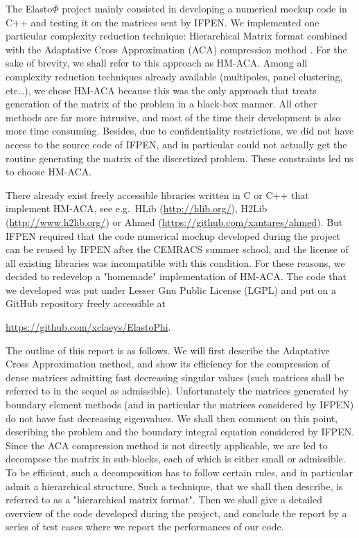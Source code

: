 \bigskip
The Elasto$\Phi$ project mainly consisted in developing a numerical mockup code in C++ and testing it on the matrices sent 
by IFPEN. We implemented one particular complexity reduction technique: Hierarchical Matrix \cite{Hackbusch2016} format combined with the Adaptative Cross 
Approximation (ACA) compression method \cite{Bebendorf2008}. For the sake of brevity, we shall refer to this approach as HM-ACA. 
Among all complexity reduction techniques 
already available (multipoles, panel clustering, etc\dots), we chose HM-ACA because this was the only approach that treats generation 
of the matrix of the problem in a black-box manner. All other methods are far more intrusive, and most of the time their development 
is also more time consuming. Besides, due to confidentiality restrictions, we did not have access to the source code of IFPEN, and 
in particular could not actually get the routine generating the matrix of the discretized problem. These constraints led us to choose HM-ACA.

\bigskip
There already exist freely accessible libraries written in C or C++ that implement HM-ACA, see e.g.~HLib (\url{http://hlib.org/}), H2Lib 
(\url{http://www.h2lib.org/}) or Ahmed (\url{https://github.com/xantares/ahmed}). But IFPEN required 
that the code numerical mockup developed during the project can be reused by IFPEN after the CEMRACS summer school, 
and the license of all existing libraries was incompatible with this condition. For these reasons, we decided to redevelop 
a "homemade" implementation of HM-ACA. The code that we developed was put under Lesser Gnu Public License (LGPL) and 
put on a GitHub repository freely accessible at
\begin{center}
\url{https://github.com/xclaeys/ElastoPhi}.
\end{center}

\medskip
The outline of this report is as follows. We will first describe the Adaptative Cross Approximation method, and show its efficiency 
for the compression of dense matrices admitting fast decreasing singular values (such matrices shall be referred to in the sequel as admissible). 
Unfortunately the matrices generated by boundary element  methods (and in particular the matrices considered by IFPEN) do not have 
fast decreasing eigenvalues. We shall then comment on this point, describing the problem and the boundary integral equation 
considered by IFPEN. Since the ACA compression method is not directly applicable, we are led to decompose the matrix in sub-blocks, 
each of which is either small or admissible. To be efficient, such a decomposition has to follow certain rules, and in particular 
admit a hierarchical structure. Such a technique, that we shall then describe, is referred to as a "hierarchical matrix format". 
Then we shall give a detailed overview of the code developed during the project, and conclude the report by a series of test 
cases where we report the performances of our code.


